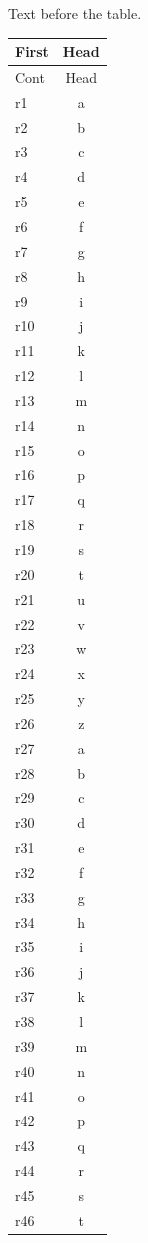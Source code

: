 \documentclass[12pt]{article}
\begin{document}
Text before the table.

\begin{longtable}{lc}
\hline First & Head\\\hline
\endfirsthead
\hline Cont & Head\\\hline
\endhead
\hline
\endfoot
\hline\hline
\endlastfoot
r1 & a\\
r2 & b\\
r3 & c\\
r4 & d\\
r5 & e\\
r6 & f\\
r7 & g\\
r8 & h\\
r9 & i\\
r10 & j\\
r11 & k\\
r12 & l\\
r13 & m\\
r14 & n\\
r15 & o\\
r16 & p\\
r17 & q\\
r18 & r\\
r19 & s\\
r20 & t\\
r21 & u\\
r22 & v\\
r23 & w\\
r24 & x\\
r25 & y\\
r26 & z\\
r27 & a\\
r28 & b\\
r29 & c\\
r30 & d\\
r31 & e\\
r32 & f\\
r33 & g\\
r34 & h\\
r35 & i\\
r36 & j\\
r37 & k\\
r38 & l\\
r39 & m\\
r40 & n\\
r41 & o\\
r42 & p\\
r43 & q\\
r44 & r\\
r45 & s\\
r46 & t\\

\end{longtable}
\end{document}
